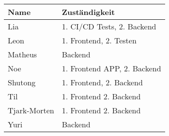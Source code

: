 \begin{tabular}{ll}
 \rowcolor[HTML]{E7E7E7}
 \textbf{Name} & \textbf{Zuständigkeit} \\ \hline
 Lia & 1. CI/CD Tests, 2. Backend \\
 \rowcolor[HTML]{E7E7E7}
 Leon & 1. Frontend, 2. Testen \\
 Matheus & Backend \\
 \rowcolor[HTML]{E7E7E7}
 Noe & 1. Frontend APP, 2. Backend \\
 Shutong & 1. Frontend, 2. Backend \\
 \rowcolor[HTML]{E7E7E7}
 Til & 1. Frontend 2. Backend \\
 Tjark-Morten & 1. Frontend 2. Backend \\
 \rowcolor[HTML]{E7E7E7}
 Yuri & Backend \\
\end{tabular}

\bigskip
